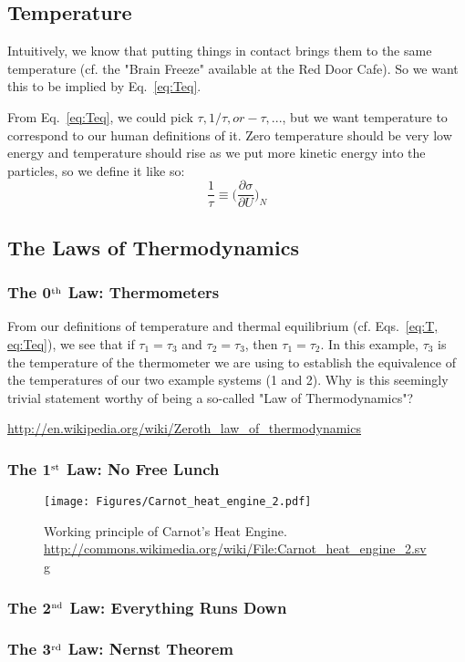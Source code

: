 \subsection{Temperature}
\label{s:Temperature}

Intuitively, we know that putting things in contact brings them to the same temperature
(cf. the "Brain Freeze" available at the Red Door Cafe). So we want this to be
implied by Eq.~\ref{eq:Teq}.

From Eq.~\ref{eq:Teq}, we could pick $\tau, 1/\tau, or -\tau,...$, but we want temperature
to correspond to our human definitions of it. Zero temperature should be very low energy
and temperature should rise as we put more kinetic energy into the particles, so we define
it like so:
\begin{equation}
\frac{1}{\tau} \equiv \bigg(\frac{\partial \sigma}{\partial U}\bigg)_{N}
\label{eq:T}
\end{equation}

\subsection{The Laws of Thermodynamics}

\subsubsection{The 0$^{\rm th}$ Law: Thermometers}
From our definitions of temperature and thermal equilibrium (cf. Eqs.~\ref{eq:T, eq:Teq}), 
we see that if $\tau_1 = \tau_3$ and $\tau_2 = \tau_3$, then $\tau_1 = \tau_2$. In this example,
$\tau_3$ is the temperature of the thermometer we are using to establish the equivalence of the
temperatures of our two example systems (1 and 2). Why is this seemingly trivial statement worthy
of being a so-called "Law of Thermodynamics"? 

\url{http://en.wikipedia.org/wiki/Zeroth_law_of_thermodynamics}

\subsubsection{The 1$^{\rm st}$ Law: No Free Lunch}
\begin{figure}[h]
\centering
\texttt{[image: Figures/Carnot\_heat\_engine\_2.pdf]}
\caption{Working principle of Carnot's Heat Engine. \\
	\url{http://commons.wikimedia.org/wiki/File:Carnot_heat_engine_2.svg}}
\end{figure}

\subsubsection{The 2$^{\rm nd}$ Law: Everything Runs Down}

\subsubsection{The 3$^{\rm rd}$ Law: Nernst Theorem}



